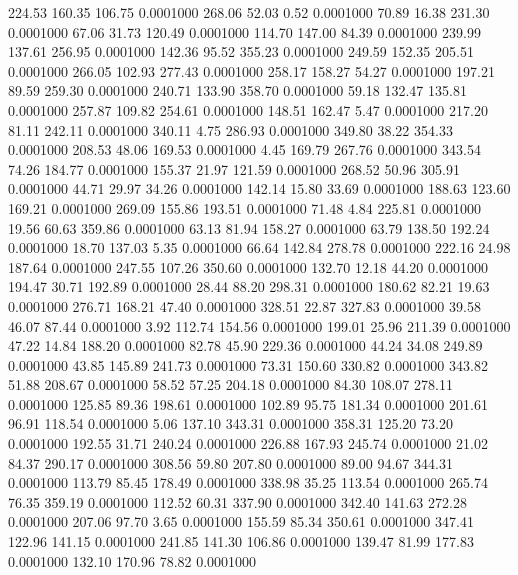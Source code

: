  224.53  160.35  106.75   0.0001000
 268.06   52.03    0.52   0.0001000
  70.89   16.38  231.30   0.0001000
  67.06   31.73  120.49   0.0001000
 114.70  147.00   84.39   0.0001000
 239.99  137.61  256.95   0.0001000
 142.36   95.52  355.23   0.0001000
 249.59  152.35  205.51   0.0001000
 266.05  102.93  277.43   0.0001000
 258.17  158.27   54.27   0.0001000
 197.21   89.59  259.30   0.0001000
 240.71  133.90  358.70   0.0001000
  59.18  132.47  135.81   0.0001000
 257.87  109.82  254.61   0.0001000
 148.51  162.47    5.47   0.0001000
 217.20   81.11  242.11   0.0001000
 340.11    4.75  286.93   0.0001000
 349.80   38.22  354.33   0.0001000
 208.53   48.06  169.53   0.0001000
   4.45  169.79  267.76   0.0001000
 343.54   74.26  184.77   0.0001000
 155.37   21.97  121.59   0.0001000
 268.52   50.96  305.91   0.0001000
  44.71   29.97   34.26   0.0001000
 142.14   15.80   33.69   0.0001000
 188.63  123.60  169.21   0.0001000
 269.09  155.86  193.51   0.0001000
  71.48    4.84  225.81   0.0001000
  19.56   60.63  359.86   0.0001000
  63.13   81.94  158.27   0.0001000
  63.79  138.50  192.24   0.0001000
  18.70  137.03    5.35   0.0001000
  66.64  142.84  278.78   0.0001000
 222.16   24.98  187.64   0.0001000
 247.55  107.26  350.60   0.0001000
 132.70   12.18   44.20   0.0001000
 194.47   30.71  192.89   0.0001000
  28.44   88.20  298.31   0.0001000
 180.62   82.21   19.63   0.0001000
 276.71  168.21   47.40   0.0001000
 328.51   22.87  327.83   0.0001000
  39.58   46.07   87.44   0.0001000
   3.92  112.74  154.56   0.0001000
 199.01   25.96  211.39   0.0001000
  47.22   14.84  188.20   0.0001000
  82.78   45.90  229.36   0.0001000
  44.24   34.08  249.89   0.0001000
  43.85  145.89  241.73   0.0001000
  73.31  150.60  330.82   0.0001000
 343.82   51.88  208.67   0.0001000
  58.52   57.25  204.18   0.0001000
  84.30  108.07  278.11   0.0001000
 125.85   89.36  198.61   0.0001000
 102.89   95.75  181.34   0.0001000
 201.61   96.91  118.54   0.0001000
   5.06  137.10  343.31   0.0001000
 358.31  125.20   73.20   0.0001000
 192.55   31.71  240.24   0.0001000
 226.88  167.93  245.74   0.0001000
  21.02   84.37  290.17   0.0001000
 308.56   59.80  207.80   0.0001000
  89.00   94.67  344.31   0.0001000
 113.79   85.45  178.49   0.0001000
 338.98   35.25  113.54   0.0001000
 265.74   76.35  359.19   0.0001000
 112.52   60.31  337.90   0.0001000
 342.40  141.63  272.28   0.0001000
 207.06   97.70    3.65   0.0001000
 155.59   85.34  350.61   0.0001000
 347.41  122.96  141.15   0.0001000
 241.85  141.30  106.86   0.0001000
 139.47   81.99  177.83   0.0001000
 132.10  170.96   78.82   0.0001000

